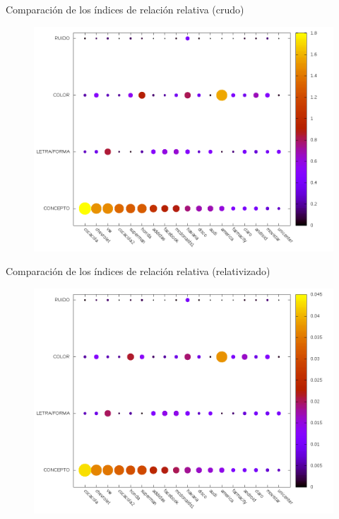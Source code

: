 \documentclass{beamer}
\begin{document}
\begin{frame}
\centering
Comparación de los índices de relación relativa (crudo)
\begin{figure}[h]
 \centering
  \begin{minipage}[c]{1\textwidth}
	\centering	
	\includegraphics[scale=0.4]{target_ir.png}
  \end{minipage}
\end{figure}
\end{frame}

\begin{frame}
\centering
Comparación de los índices de relación relativa (relativizado)
\begin{figure}[h]
 \centering
  \begin{minipage}[c]{1\textwidth}
	\centering	
	\includegraphics[scale=0.4]{target_irr.png}
  \end{minipage}
\end{figure}
\end{frame}
\end{document}
